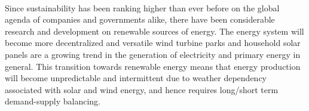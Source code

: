 \documentclass{scrartcl}
\begin{document}
    \paragraph{}
    Since sustainability has been ranking higher than ever before on the global agenda of companies and governments alike, there have been considerable research and development on renewable sources of energy. The energy system will become more decentralized and versatile wind turbine parks and household solar panels are a growing trend in the generation of electricity and primary energy in general. This transition towards renewable energy means that energy production will become unpredictable and intermittent due to weather dependency associated with solar and wind energy, and hence requires long/short term demand-supply balancing.
    
    \paragraph{}
\end{document}
